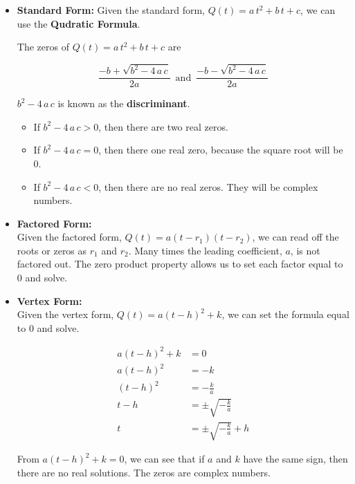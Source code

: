 \documentclass{ximera}
\begin{document}
\begin{itemize}

\item \textbf{\textcolor{purple!85!blue}{Standard Form:}}  Given the standard form, $Q(t) = a \, t^2 + b \, t + c$, we can use the \textbf{Qudratic Formula}.

The zeros of $Q(t) = a \, t^2 + b \, t + c$ are

\[   \frac{-b + \sqrt{b^2 - 4 \, a \, c}}{2a}      \, \text{ and } \,       \frac{-b - \sqrt{b^2 - 4 \, a \, c}}{2a}    \]



$b^2 - 4 \, a \, c$ is known as the \textbf{discriminant}. 




\begin{itemize}
\item If $b^2 - 4 \, a \, c > 0$, then there are two real zeros.
\item If $b^2 - 4 \, a \, c = 0$, then there one real zero, because the square root will be $0$.
\item If $b^2 - 4 \, a \, c < 0$, then there are no real zeros.  They will be complex numbers.
\end{itemize}





\item \textbf{\textcolor{purple!85!blue}{Factored Form:}} \\ 
Given the factored form, $Q(t) = a (t - r_1)(t - r_2)$, we can read off the roots or zeros as $r_1$ and $r_2$. Many times the leading coefficient, $a$, is not factored out.  The zero product property allows us to set each factor equal to $0$ and solve.






\item  \textbf{\textcolor{purple!85!blue}{Vertex Form:}} \\
Given the vertex form, $Q(t) = a (t - h)^2 + k$, we can set the formula equal to $0$ and solve.



\begin{align*}
a (t - h)^2 + k    & = 0  \\
a (t - h)^2        & = -k  \\
(t - h)^2        & = -\frac{k}{a}  \\
t - h        & = \pm \sqrt{-\frac{k}{a}}  \\
t        & = \pm \sqrt{-\frac{k}{a}}  + h
\end{align*}

From $a (t - h)^2 + k  = 0$, we can see that if $a$ and $k$ have the same sign, then there are no real solutions.  The zeros are complex numbers.



\end{itemize}
\end{document}
